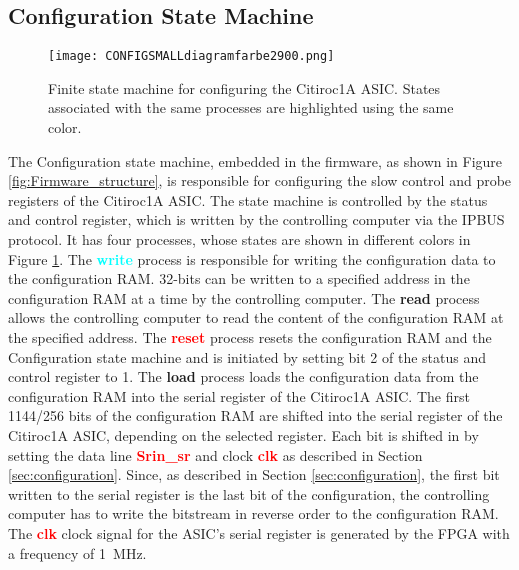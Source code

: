 \subsection{Configuration State Machine}
\begin{figure}[H]
    \centering
    \texttt{[image: CONFIGSMALLdiagramfarbe2900.png]}%
    \caption{Finite state machine for configuring the Citiroc1A ASIC.
    States associated with the same processes are highlighted using the same color.}
    \label{fig:Configuration_state_machine}
\end{figure}
The Configuration state machine, embedded 
in the firmware, as shown in Figure \ref{fig:Firmware_structure}, is responsible for configuring the slow control and probe registers of the Citiroc1A ASIC.
The state machine is controlled by the status and control register, which is written by the controlling computer via the IPBUS protocol.
It has four processes, whose states are shown in different colors in Figure \ref{fig:Configuration_state_machine}.
\newline
The \textbf{\textcolor{cyan}{write}} process is responsible for writing the configuration data to the configuration RAM.
32-bits can be written to a specified address in the configuration RAM at a time by the controlling computer.
\newline
The \textbf{\textcolor{yellow!60!black}{read}} process allows the controlling computer to read the content of the configuration RAM at the specified address.
\newline
The \textbf{\textcolor{red}{reset}} process resets the configuration RAM and the Configuration state machine and is initiated by setting bit 2 of the status and control register to 1.
\newline
The \textbf{\textcolor{VioletRed}{load}} process loads the configuration data from the configuration RAM into the serial register of the Citiroc1A ASIC. 
The first 1144/256 bits of the configuration RAM are shifted into the serial register of the Citiroc1A ASIC, depending on the selected register.
Each bit is shifted in by setting the data line \textbf{\textcolor{red}{Srin\_sr}} and clock \textbf{\textcolor{red}{clk}} as described in Section \ref{sec:configuration}.
Since, as described in Section \ref{sec:configuration}, the first bit written to the serial register is the last bit of the configuration, the controlling computer has to write the bitstream in reverse order to the configuration RAM.
\newline
The \textbf{\textcolor{red}{clk}} clock signal for the ASIC's serial register is generated by the FPGA with a frequency of \SI{1}{\mega\hertz}.
